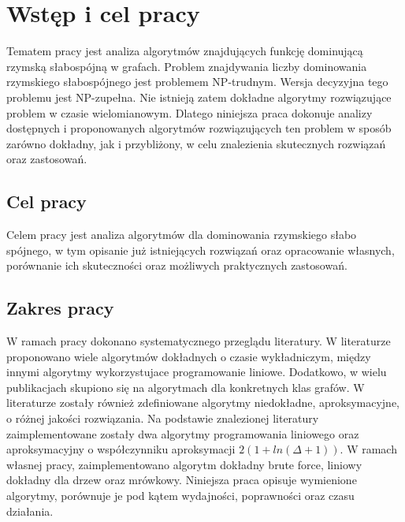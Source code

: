 \chapter{Wstęp i cel pracy}
Tematem pracy jest analiza algorytmów znajdujących funkcję dominującą rzymską słabospójną w grafach.
Problem znajdywania liczby dominowania rzymskiego słabospójnego jest problemem NP-trudnym. Wersja decyzyjna tego problemu jest NP-zupełna. Nie istnieją zatem dokładne algorytmy rozwiązujące problem w czasie wielomianowym. Dlatego niniejsza praca dokonuje analizy dostępnych i proponowanych algorytmów rozwiązujących ten problem w sposób zarówno dokładny, jak i przybliżony, w celu znalezienia skutecznych rozwiązań oraz zastosowań.

\section{Cel pracy}
Celem pracy jest analiza algorytmów dla dominowania rzymskiego słabo spójnego, w tym opisanie już istniejących rozwiązań oraz opracowanie własnych, porównanie ich skuteczności oraz możliwych praktycznych zastosowań.

\section{Zakres pracy}
W ramach pracy dokonano systematycznego przeglądu literatury. W literaturze proponowano wiele algorytmów dokładnych o czasie wykładniczym, między innymi algorytmy wykorzystujace programowanie liniowe. Dodatkowo, w wielu publikacjach skupiono się na algorytmach dla konkretnych klas grafów. W literaturze zostały również zdefiniowane algorytmy niedokładne, aproksymacyjne, o różnej jakości rozwiązania.
Na podstawie znalezionej literatury zaimplementowane zostały dwa algorytmy programowania liniowego oraz aproksymacyjny o współczynniku aproksymacji $2(1 + ln(\Delta + 1))$. W ramach własnej pracy, zaimplementowano algorytm dokładny brute force, liniowy dokładny dla drzew oraz mrówkowy.
Niniejsza praca opisuje wymienione algorytmy, porównuje je pod kątem wydajności, poprawności oraz czasu działania.


